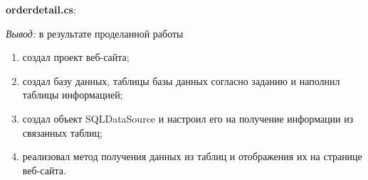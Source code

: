 \documentclass[pscyr]{hedlab}
\begin{document}
  \vspace{2em}
  \textbf{orderdetail.cs}:
  
  
  \emph{Вывод:} в результате проделанной работы
  \vspace{-.5em}  
  \begin{enumerate}
    \itemsep -5pt
    \item создал проект веб-сайта;
    \item создал базу данных, таблицы базы данных согласно заданию и
      наполнил таблицы информацией;
    \item создал объект SQLDataSource и настроил его на получение информации
      из связанных таблиц;
    \item реализовал метод получения данных из таблиц и отображения их на
      странице веб-сайта.
  \end{enumerate}
\end{document}
